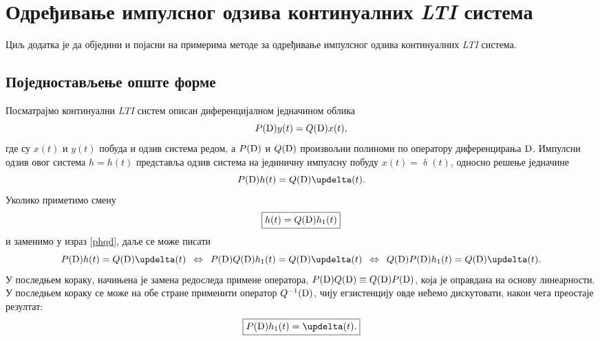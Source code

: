 
\chapter{Одређивање импулсног одзива континуалних 
\textit{LTI} система} \label{a:impulsni_odziv}

Циљ додатка је да обједини и појасни на примерима
методе за одређивање импулсног одзива континуалних 
\textit{LTI} система. 


\section*{Поједностављење опште форме}

Посматрајмо континуални \textit{LTI} систем описан 
диференцијалном једначином облика
\begin{equation}
 P({\rm D}) y(t) = Q({\rm D}) x(t),
 \label{def}
\end{equation}
где су $x(t)$ и $y(t)$ побуда и одзив система редом, а  $P({\rm D})$ и $Q({\rm D})$ произвољни полиноми 
по оператору диференцирања $\rm D$. Импулсни  
одзив овог система $h = h(t)$ представља одзив система на 
јединичну импулсну
побуду $x(t) = \updelta(t)$, односно решење једначине
\begin{equation}
 P({\rm D}) h(t) = Q({\rm D}) \updelta(t).
 \label{phqd}
\end{equation}
Уколико приметимо смену 
\begin{equation}
\boxed{
 h(t) = Q({\rm D}) h_1(t)
} \label{hqh1}
\end{equation}
и заменимо у израз \eqref{phqd}, даље се може писати
\begin{equation}
P({\rm D}) h(t) = Q({\rm D}) \updelta(t) 
\enspace\Leftrightarrow\enspace
P({\rm D}) Q({\rm D}) h_1(t) = Q({\rm D}) \updelta(t) 
\enspace\Leftrightarrow\enspace
Q({\rm D}) P({\rm D}) h_1(t) = Q({\rm D}) \updelta(t). 
\end{equation}
У последњем кораку, начињена је замена редоследа 
примене оператора, $P({\rm D}) Q({\rm D})
\equiv Q({\rm D}) P({\rm D})$, која је 
оправдана на основу линеарности. У последњем 
кораку се може на обе стране применити оператор
$Q^{-1}({\rm D})$, чију егзистенцију овде нећемо
дискутовати, након чега преостаје резултат:
\begin{equation}
\boxed{
P({\rm D}) h_1(t) = \updelta(t). 
} \label{eq2}
\end{equation}

\noindent
{} 


